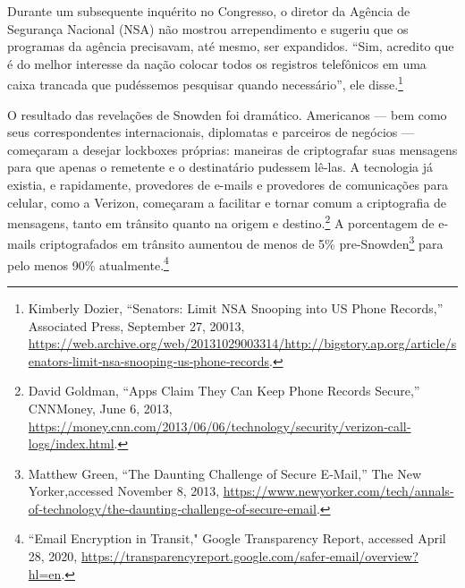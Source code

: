 \documentclass{book}
\begin{document}
Durante um subsequente inquérito no Congresso, o diretor da Agência de Segurança Nacional (NSA) não mostrou arrependimento e sugeriu que os programas da agência precisavam, até mesmo, ser expandidos. ``Sim, acredito que é do melhor interesse da nação colocar todos os registros telefônicos em uma caixa trancada que pudéssemos pesquisar quando necessário'', ele disse.\footnote{Kimberly Dozier, “Senators: Limit NSA Snooping into US Phone Records,” Associated Press, September 27, 20013, \url{https://web.archive.org/web/20131029003314/http://bigstory.ap.org/article/senators‐limit‐nsa-snooping‐us‐phone‐records}.}

O resultado das revelações de Snowden foi dramático. Americanos --- bem como seus correspondentes internacionais, diplomatas e parceiros de negócios --- começaram a desejar lockboxes próprias: maneiras de criptografar suas mensagens para que apenas o remetente e o destinatário pudessem lê-las. A tecnologia já existia, e rapidamente, provedores de e-mails e provedores de comunicações para celular, como a Verizon, começaram a facilitar e tornar comum a criptografia de mensagens, tanto em trânsito quanto na origem e destino.\footnote{David Goldman, “Apps Claim They Can Keep Phone Records Secure,” CNNMoney, June 6, 2013, \url{https://money.cnn.com/2013/06/06/technology/security/verizon‐call‐logs/index.html}.} A porcentagem de e-mails criptografados em trânsito aumentou de menos de 5\% pre-Snowden\footnote{Matthew Green, “The Daunting Challenge of Secure E‐Mail,” The New Yorker,accessed November 8, 2013, \url{https://www.newyorker.com/tech/annals‐of‐technology/the‐daunting‐challenge‐of‐secure‐email}.} para pelo menos 90\% atualmente.\footnote{“Email Encryption in Transit," Google Transparency Report, accessed April 28, 2020, \url{https://transparencyreport.google.com/safer‐email/overview?hl=en}.}
\end{document}
